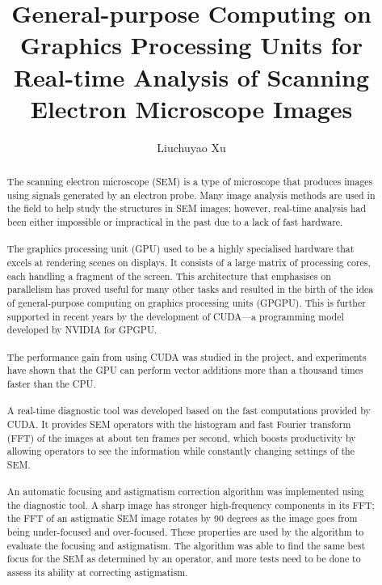 \documentclass[12pt, twocolumn]{report}
\author{Liuchuyao Xu}
\title{General-purpose Computing on Graphics Processing Units for Real-time Analysis of Scanning Electron Microscope Images}
\begin{document}
\maketitle
\tableofcontents

\begin{abstract}    
\paragraph{}
The scanning electron microscope (SEM) is a type of microscope that produces images using signals generated by an electron probe. Many image analysis methods are used in the field to help study the structures in SEM images; however, real-time analysis had been either impossible or impractical in the past due to a lack of fast hardware.

\paragraph{}
The graphics processing unit (GPU) used to be a highly specialised hardware that excels at rendering scenes on displays. It consists of a large matrix of processing cores, each handling a fragment of the screen. This architecture that emphasises on parallelism has proved useful for many other tasks and resulted in the birth of the idea of general-purpose computing on graphics processing units (GPGPU). This is further supported in recent years by the development of CUDA---a programming model developed by NVIDIA for GPGPU.

\paragraph{}
The performance gain from using CUDA was studied in the project, and experiments have shown that the GPU can perform vector additions more than a thousand times faster than the CPU.

\paragraph{}
A real-time diagnostic tool was developed based on the fast computations provided by CUDA. It provides SEM operators with the histogram and fast Fourier transform (FFT) of the images at about ten frames per second, which boosts productivity by allowing operators to see the information while constantly changing settings of the SEM.

\paragraph{}
An automatic focusing and astigmatism correction algorithm was implemented using the diagnostic tool. A sharp image has stronger high-frequency components in its FFT; the FFT of an astigmatic SEM image rotates by 90 degrees as the image goes from being under-focused and over-focused. These properties are used by the algorithm to evaluate the focusing and astigmatism. The algorithm was able to find the same best focus for the SEM as determined by an operator, and more tests need to be done to assess its ability at correcting astigmatism.
\end{abstract}
\end{document}
